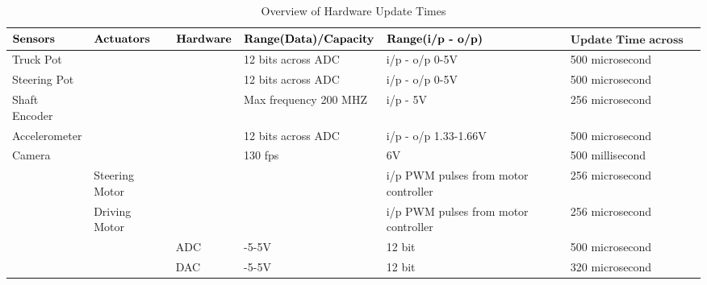 \begin {table}[ht]
 \centering
 \caption{Overview of Hardware Update Times \label{table:time}}
 \begin{sideways}
 \begin{tabular}{||p{}|p{}|p{}|p{}|p{}|p{}||}
 \hline \hline
  $\vspace{0.03in} \textbf{Sensors}$ & $\vspace{0.03in} \textbf{Actuators}$ & $\vspace{0.03in}\textbf{Hardware}$ & $\vspace{0.03in} \textbf{Range(Data)/Capacity}$ & $\vspace{0.03in} \textbf{Range(i/p - o/p) }$ & $\textbf{Update Time across Port}$\\
 \hline \hline
Truck Pot &   &  & 12 bits across ADC & i/p - o/p 0-5V & 500 microsecond\\
 \hline
Steering Pot &   &  & 12 bits across ADC & i/p - o/p 0-5V & 500 microsecond\\
 \hline
Shaft Encoder &   &  & Max frequency 200 MHZ & i/p - 5V & 256 microsecond\\
\hline
Accelerometer &   &  & 12 bits across ADC & i/p - o/p 1.33-1.66V & 500 microsecond\\
\hline
 Camera&  &  &130 fps  & 6V & 500 millisecond\\
\hline
 & Steering Motor  &  & & i/p PWM pulses from motor controller & 256 microsecond\\
\hline
& Driving Motor  &  & & i/p PWM pulses from motor controller & 256 microsecond\\
\hline
&   & ADC& -5-5V& 12 bit & 500 microsecond\\
\hline
&   & DAC& -5-5V& 12 bit & 320 microsecond\\
\hline\hline
\end{tabular}
\end{sideways}

\end{table}



